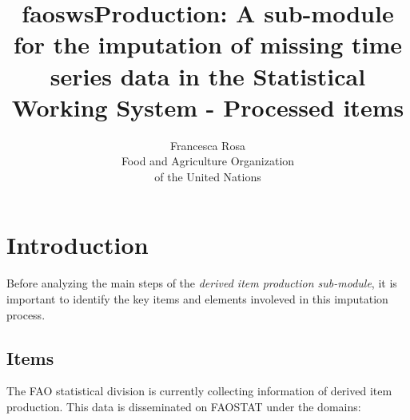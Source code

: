\documentclass[nojss]{jss}
\title{\bf faoswsProduction: A sub-module for the imputation of missing time
series data in the Statistical Working System - Processed items }
\author{Francesca Rosa\\ Food and Agriculture
    Organization \\ of the United Nations\\}
\begin{document}

\SwaveParseOpstions


\section {Introduction}
Before analyzing the main steps of the \textit{derived item production sub-module}, it is important to identify the key items and elements involeved in this imputation process. 

\subsection {Items}

The FAO statistical division is currently collecting information of derived item production. This data is disseminated on FAOSTAT under the domains:
\end{document}
